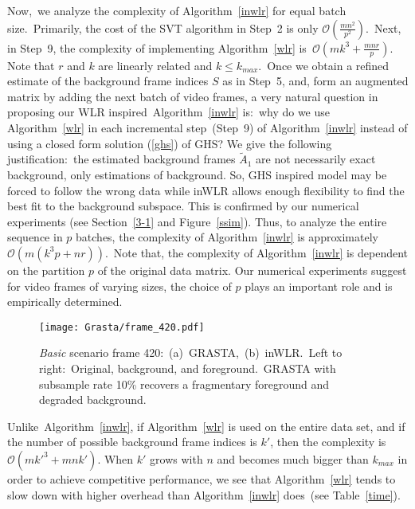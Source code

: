 \documentclass[10pt,twocolumn,letterpaper]{article}
\begin{document}
Now,~we analyze the complexity of
Algorithm~\ref{inwlr} for equal batch size.~Primarily, the cost of
the SVT algorithm in Step~2 is only
$\mathcal{O}(\frac{mn^2}{p^2})$.~Next, in Step~9, the complexity of
implementing Algorithm~\ref{wlr}
is~$\mathcal{O}(mk^3+\frac{mnr}{p})$. Note that $r$ and $k$ are
linearly related and $k \leq k_{max}$.~Once we obtain a refined
estimate of the background frame indices $S$ as in Step~5, and, form
an augmented matrix by adding the next batch of video frames, a very
natural question in proposing our WLR inspired~Algorithm~\ref{inwlr}
is:~why do we use Algorithm~\ref{wlr} in each incremental
step~(Step~9) of Algorithm~\ref{inwlr} instead of using a closed
form solution (\ref{ghs}) of GHS? We give the following
justification:~the estimated background frames $\tilde{A}_1$ are not
necessarily exact background, only estimations of background. So,
GHS inspired model may be forced to follow the wrong data while
inWLR allows enough flexibility to find the best fit to the
background subspace. This is confirmed by our numerical experiments
(see Section~\ref{3-1} and Figure~\ref{ssim}). Thus, to analyze the
entire sequence in $p$ batches, the complexity of
Algorithm~\ref{inwlr} is approximately
$\mathcal{O}(m(k^3p+nr))$.~Note that, the complexity of
Algorithm~\ref{inwlr} is dependent on the partition $p$ of the
original data matrix. Our numerical experiments suggest for video
frames of varying sizes, the choice of $p$ plays an important role
and is empirically determined.
\begin{figure}
    \centering
    \texttt{[image: Grasta/frame\_420.pdf]}
    \caption{{\it Basic} scenario frame 420:~(a)~GRASTA,~(b)~inWLR.~Left to right:~Original, background, and foreground.~GRASTA with subsample rate 10\% recovers a fragmentary foreground and degraded background.}
    \label{grasta_qual}
\end{figure}


Unlike~Algorithm~\ref{inwlr}, if Algorithm~\ref{wlr} is used on the
entire data set, and if the number of possible background frame indices
is $k'$, then the complexity is $\mathcal{O}(m{k'}^3+mnk')$. When
$k'$ grows with $n$ and becomes much bigger than $k_{max}$ in order to achieve competitive
performance, we see that Algorithm~\ref{wlr} tends to slow down with higher
overhead than Algorithm~\ref{inwlr} does~(see Table~\ref{time}).
\vspace{-0.0in}
\end{document}
